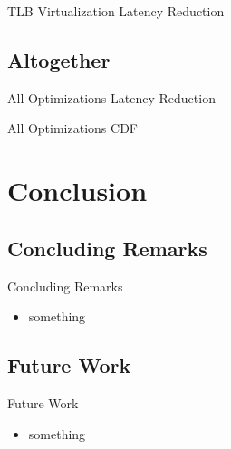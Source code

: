\documentclass[10pt,hyperref={hyperfootnotes=false}, xcolor={usenames, dvipsnames}]{beamer}
\begin{document}
\begin{frame}{TLB Virtualization} {Latency Reduction}
    \begingroup
	
	\endgroup
\end{frame}

\subsection{Altogether}
\begin{frame}{All Optimizations} {Latency Reduction}
    \begingroup
	
	\endgroup
\end{frame}

\begin{frame}{All Optimizations} {CDF}
    \begingroup
	
	\endgroup
\end{frame}

\section{Conclusion}
\subsection{Concluding Remarks}
\begin{frame}{Concluding Remarks}
  \begin{itemize}
  \item {something}
  \end{itemize}
\end{frame}
\subsection{Future Work}
\begin{frame}{Future Work}
  \begin{itemize}
  \item {something}
  \end{itemize}
\end{frame}
\end{document}
